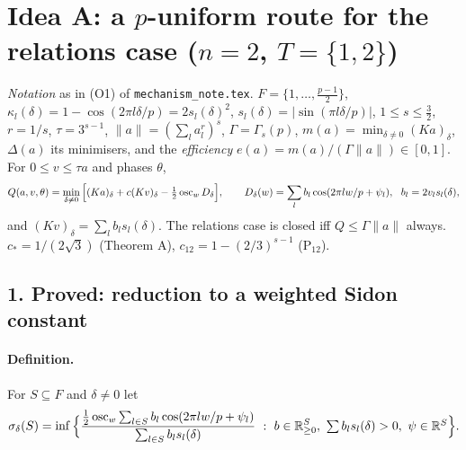 \documentclass[11pt]{article}
\theoremstyle{remark}\newtheorem{remark}[theorem]{Remark}
\begin{document}
\section*{Idea A: a $p$-uniform route for the relations case ($n=2$, $T=\{1,2\}$)}
\emph{Notation} as in (O1) of \texttt{mechanism\_note.tex}.  $F=\{1,\dots,\frac{p-1}2\}$, $\kappa_l(\delta)=1-\cos(2\pi l\delta/p)=2s_l(\delta)^2$,
$s_l(\delta)=|\sin(\pi l\delta/p)|$, $1\le s\le\frac32$, $r=1/s$, $\tau=3^{s-1}$, $\|a\|=(\sum_la_l^r)^s$, $\Gamma=\Gamma_s(p)$,
$m(a)=\min_{\delta\ne0}(Ka)_\delta$, $\Delta(a)$ its minimisers, and the \emph{efficiency} $e(a)=m(a)/(\Gamma\|a\|)\in[0,1]$.  For $0\le v\le\tau a$ and phases $\theta$,
\[Q(a,v,\theta)=\min_{\delta\ne0}\Big[(Ka)_\delta+c(Kv)_\delta-\tfrac12\osc_wD_\delta\Big],\qquad D_\delta(w)=\sum_lb_l\cos(2\pi lw/p+\psi_l),\ \ b_l=2v_ls_l(\delta),\]
and $(Kv)_\delta=\sum_lb_ls_l(\delta)$.  The relations case is closed iff $Q\le\Gamma\|a\|$ always.  $c_*=1/(2\sqrt3)$ (Theorem A), $c_{12}=1-(2/3)^{s-1}$ (P$_{12}$).

\subsection*{1. Proved: reduction to a weighted Sidon constant}
\paragraph{Definition.}  For $S\subseteq F$ and $\delta\ne0$ let
\[\sigma_\delta(S)=\inf\Big\{\frac{\frac12\osc_w\sum_{l\in S}b_l\cos(2\pi lw/p+\psi_l)}{\sum_{l\in S}b_ls_l(\delta)}\ :\ b\in\mathbb R^S_{\ge0},\ \textstyle\sum b_ls_l(\delta)>0,\ \psi\in\mathbb R^S\Big\}.\]
\end{document}
